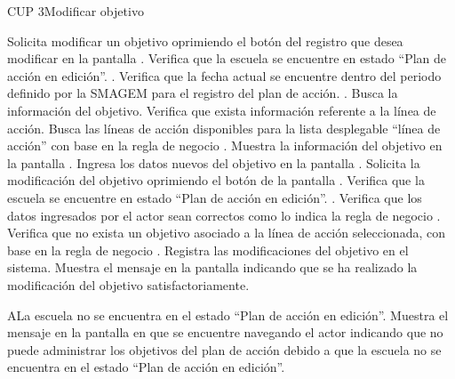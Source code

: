 \begin{UseCase}{CUP 3}{Modificar objetivo}


 \end{UseCase}
 
 
\begin{UCtrayectoria}
	\UCpaso[\UCactor] Solicita modificar un objetivo oprimiendo el botón \botEdit del registro que desea modificar en la pantalla .
	\UCpaso[\UCsist] Verifica que la escuela se encuentre en  estado ``Plan de acción en edición''. .
    \UCpaso[\UCsist] Verifica que la fecha actual se encuentre dentro del periodo definido por la SMAGEM para el registro del plan de acción. .
	\UCpaso[\UCsist] Busca la información del objetivo.
	\UCpaso[\UCsist] Verifica que exista información referente a la línea de acción. 
	\UCpaso[\UCsist] Busca las líneas de acción disponibles para la lista desplegable ``línea de acción'' con base en la regla de negocio .
	\UCpaso[\UCsist] Muestra la información del objetivo en la pantalla .
	\UCpaso[\UCactor] Ingresa los datos nuevos del objetivo en la pantalla .\label{cup3:ingresarDatos} 
	\UCpaso[\UCactor] Solicita la modificación del objetivo oprimiendo el botón  de la pantalla . 
	\UCpaso[\UCsist] Verifica que la escuela se encuentre en  estado ``Plan de acción en edición''. .
	\UCpaso[\UCsist] Verifica que los datos ingresados por el actor sean correctos como lo indica la regla de negocio .  
	\UCpaso[\UCsist] Verifica que no exista un objetivo asociado a la línea de acción seleccionada, con base en la regla de negocio .  %
	\UCpaso[\UCsist] Registra las modificaciones del objetivo en el sistema. 
	\UCpaso[\UCsist] Muestra el mensaje  en la pantalla  indicando que se ha realizado la modificación del objetivo satisfactoriamente.
\end{UCtrayectoria}

\begin{UCtrayectoriaA}{A}{La escuela no se encuentra en el estado ``Plan de acción en edición''.}
    \UCpaso[\UCsist] Muestra el mensaje  en la pantalla en que se encuentre navegando el actor indicando que no puede administrar los objetivos del plan de acción debido a que la escuela no se encuentra en el estado ``Plan de acción en edición''. 
 \end{UCtrayectoriaA}
 
